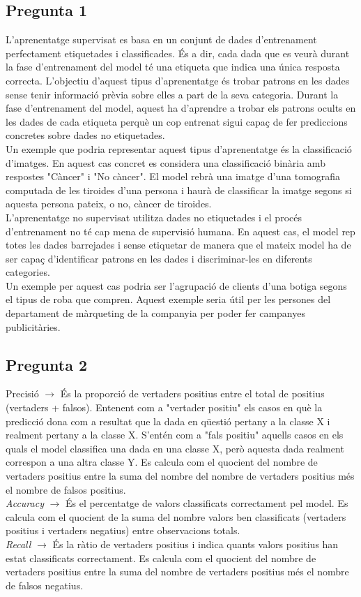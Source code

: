 \documentclass[a4paper,12pt]{report}
\begin{document}
\subsection*{Pregunta 1}
L'aprenentatge supervisat es basa en un conjunt de dades d'entrenament perfectament etiquetades i classificades. És a dir, cada dada que es veurà durant la fase d'entrenament del model té una etiqueta que indica una única resposta correcta. L'objectiu d'aquest tipus d'aprenentatge és trobar patrons en les dades sense tenir informació prèvia sobre elles a part de la seva categoria. Durant la fase d'entrenament del model, aquest ha d'aprendre a trobar els patrons ocults en les dades de cada etiqueta perquè un cop entrenat sigui capaç de fer prediccions concretes sobre dades no etiquetades.\\
Un exemple que podria representar aquest tipus d'aprenentatge és la classificació d'imatges. En aquest cas concret es considera una classificació binària amb respostes "Càncer" i "No càncer". El model rebrà una imatge d'una tomografia computada de les tiroides d'una persona i haurà de classificar la imatge segons si aquesta persona pateix, o no, càncer de tiroides.\\
L'aprenentatge no supervisat utilitza dades no etiquetades i el procés d'entrenament no té cap mena de supervisió humana. En aquest cas, el model rep totes les dades barrejades i sense etiquetar de manera que el mateix model ha de ser capaç d'identificar patrons en les dades i discriminar-les en diferents categories.\\
Un exemple per aquest cas podria ser l'agrupació de clients d'una botiga segons el tipus de roba que compren. Aquest exemple seria útil per les persones del departament de màrqueting de la companyia per poder fer campanyes publicitàries.
\subsection*{Pregunta 2}
Precisió $\longrightarrow$ És la proporció de vertaders positius entre el total de positius (vertaders + falsos). Entenent com a "vertader positiu" els casos en què la predicció dona com a resultat que la dada en qüestió pertany a la classe X i realment pertany a la classe X. S'entén com a "fals positiu" aquells casos en els quals el model classifica una dada en una classe X, però aquesta dada realment correspon a una altra classe Y. Es calcula com el quocient del nombre de vertaders positius entre la suma del nombre del nombre de vertaders positius més el nombre de falsos positius.\\
\textit{Accuracy} $\longrightarrow$ És el percentatge de valors classificats correctament pel model. Es calcula com el quocient de la suma del nombre valors ben classificats (vertaders positius i vertaders negatius) entre observacions totals.\\
\textit{Recall} $\longrightarrow$ És la ràtio de vertaders positius i indica quants valors positius han estat classificats correctament. Es calcula com el quocient del nombre de vertaders positius entre la suma del nombre de vertaders positius més el nombre de falsos negatius.
\end{document}
